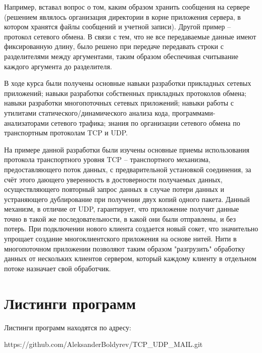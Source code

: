Например, вставал вопрос о том, каким образом хранить сообщения на сервере (решением являлось организация директории в корне приложения сервера, в котором хранятся файлы сообщений и учетной записи). Другой пример – протокол сетевого обмена. В связи с тем, что не все передаваемые данные имеют фиксированную длину, было решено при передаче передавать строки с разделителями между аргументами, таким образом обеспечивая считывание каждого аргумента до разделителя.

В ходе курса были получены основные навыки разработки прикладных сетевых приложений; навыки разработки собственных прикладных протоколов обмена; навыки разработки многопоточных сетевых приложений; навыки работы с утилитами статического/динамического анализа кода, программами-анализаторами сетевого трафика; знания по организации сетевого обмена по транспортным протоколам TCP и UDP. 

На примере данной разработки были изучены основные приемы использования протокола транспортного уровня TCP – транспортного механизма, предоставляющего поток данных, с предварительной установкой соединения, за счёт этого дающего уверенность в достоверности получаемых данных, осуществляющего повторный запрос данных в случае потери данных и устраняющего дублирование при получении двух копий одного пакета. Данный механизм, в отличие от UDP, гарантирует, что приложение получит данные точно в такой же последовательности, в какой они были отправлены, и без потерь. При подключении нового клиента создается новый сокет, что значительно упрощает создание многоклиентского приложения на основе нитей. Нити в многопоточном приложении позволяют таким образом "разгрузить" обработку данных от нескольких клиентов сервером, который каждому клиенту в отдельном потоке назначает свой обработчик.

\section{Листинги программ}

Листинги программ находятся по адресу: 

https://github.com/AleksanderBoldyrev/TCP\_UDP\_MAIL.git



